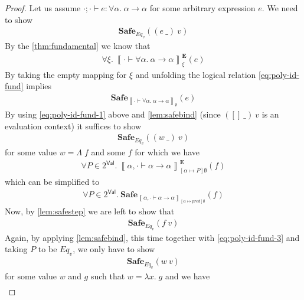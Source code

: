 \documentclass{article}
\newcommand{\VAL}{\mathsf{Val}}
\newcommand{\empectx}{[]}
\newcommand{\pred}{P}
\newcommand{\semtyp}[3]{\left\llbracket #2 \vdash #3 \right\rrbracket_{#1}}
\newcommand{\semErel}[1]{#1^{\textbf{E}}}
\newcommand{\semenv}{\xi}
\newcommand{\TArg}{\_}
\newcommand{\TLam}{\Lambda}
\newcommand{\expr}{e}
\newcommand{\exprB}{f}
\newcommand{\exprC}{g}
\newcommand{\val}{v}
\newcommand{\valB}{w}
\newcommand{\var}{x}
\newcommand{\tvar}{\alpha}
\newcommand{\typed}[4]{#1; #2 \vdash #3 : #4}
\newcommand{\Safe}[1]{\textbf{Safe}_{#1}}
\begin{document}
\begin{proof}
Let us assume $\typed{\cdot}{\cdot}{\expr}{\forall \tvar.~\tvar \to \tvar}$ for some arbitrary expression $\expr$.
We need to show
\begin{align}
  \label{eq:poly-id-to-show-1}
  \Safe{\mathit{Eq}_{\val}}((\expr~\TArg)~\val)
\end{align}
By the \ref{thm:fundamental} we know that
\begin{align}
  \label{eq:poly-id-fund}
\forall \semenv.~ \semErel{\semtyp{\semenv}{\cdot}{\forall \tvar.~\tvar \to \tvar}}(\expr)
\end{align}
By taking the empty mapping for $\semenv$ and unfolding the logical relation \ref{eq:poly-id-fund} implies
\begin{align}
  \label{eq:poly-id-fund-1}
  \Safe{\semtyp{\emptyset}{\cdot}{\forall \tvar.~\tvar \to \tvar}}(\expr)
\end{align}
By using \eqref{eq:poly-id-fund-1} above and \ref{lem:safebind} (since $(\empectx~\TArg)~\val$ is an evaluation context) it suffices to show
\begin{align}
  \label{eq:poly-id-to-show-2}
  \Safe{\mathit{Eq}_{\val}}((\valB~\TArg)~\val)
\end{align}
for some value $\valB = \TLam\; \exprB$ and some $\exprB$ for which we have
\begin{align}
  \label{eq:poly-id-fund-2}
  \forall \pred \in 2^{\VAL}.~\semErel{\semtyp{[\tvar \mapsto \pred]\emptyset}{\tvar, \cdot}{\tvar \to \tvar}}(\exprB)
\end{align}
which can be simplified to
\begin{align}
  \label{eq:poly-id-fund-3}
  \forall \pred \in 2^{\VAL}.~\Safe{\semtyp{[\tvar \mapsto pred]\emptyset}{\tvar, \cdot}{\tvar \to \tvar}}(\exprB)
\end{align}
Now, by \ref{lem:safestep} we are left to show that
\begin{align}
  \label{eq:poly-id-to-show-3}
  \Safe{\mathit{Eq}_{\val}}(\exprB~\val)
\end{align}
Again, by applying \ref{lem:safebind}, this time together with \eqref{eq:poly-id-fund-3} and taking $\pred$ to be $\mathit{Eq}_{\val}$, we only have to show
\begin{align}
  \label{eq:poly-id-to-show-4}
  \Safe{\mathit{Eq}_{\val}}(\valB~\val)
\end{align}
for some value $\valB$ and $\exprC$ such that $\valB = \lambda \var.\; \exprC$ and we have
\begin{align}
  \label{eq:poly-id-fund-4}

\end{align}
\end{proof}
\end{document}
